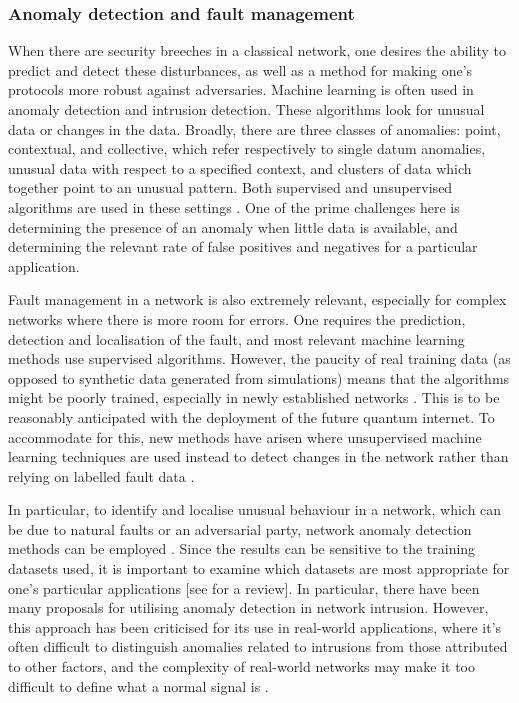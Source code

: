 \documentclass[twocolumn, aps, rmp, amsmath, amssymb, nofootinbib, superscriptaddress, longbibliography, floatfix, table-of-contents, eqsecnum]{revtex4}
\begin{document}
\subsubsection{Anomaly detection and fault management}

When there are security breeches in a classical network, one desires the ability to predict and detect these disturbances, as well as a method for making one's protocols more robust against adversaries. Machine learning is often used in anomaly detection and intrusion detection. These algorithms look for unusual data or changes in the data. Broadly, there are three classes of anomalies: point, contextual, and collective, which refer respectively to single datum anomalies, unusual data with respect to a specified context, and clusters of data which together point to an unusual pattern. Both supervised and unsupervised algorithms are used in these settings \cite{thottan2003anomaly, ahmed2007machine}. One of the prime challenges here is determining the presence of an anomaly when little data is available, and determining the relevant rate of false positives and negatives for a particular application.

Fault management in a network is also extremely relevant, especially for complex networks where there is more room for errors. One requires the prediction, detection and localisation of the fault, and most relevant machine learning methods use supervised algorithms. However, the paucity of real training data (as opposed to synthetic data generated from simulations) means that the algorithms might be poorly trained, especially in newly established networks \cite{hood1997proactive, kogeda2006prediction, snow2005assessing}. This is to be reasonably anticipated with the deployment of the future quantum internet. To accommodate for this, new methods have arisen where unsupervised machine learning techniques are used instead to detect changes in the network rather than relying on labelled fault data \cite{hajji2005statistical}.

In particular, to identify and localise unusual behaviour in a network, which can be due to natural faults or an adversarial party, network anomaly detection methods can be employed \cite{ahmed2007machine, fraley2017promise, joseph2013machine}. Since the results can be sensitive to the training datasets used, it is important to examine which datasets are most appropriate for one's particular applications [see \cite{yavanoglu2017review} for a review]. In particular, there have been many proposals for utilising anomaly detection in network intrusion. However, this approach has been criticised for its use in real-world applications, where it's often difficult to distinguish anomalies
related to intrusions from those attributed to other factors, and the complexity of real-world networks may make it too difficult to define what a normal signal is \cite{sommer2010outside}.
\end{document}
